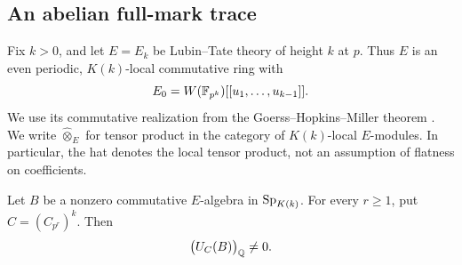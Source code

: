 \subsection{An abelian full-mark trace}

Fix \(k>0\), and let \(E=E_k\) be Lubin--Tate theory of height \(k\)
at \(p\).  Thus \(E\) is an even periodic, \(K(k)\)-local
commutative ring with
\[
 E_0=W(\mathbb F_{p^k})[[u_1,\ldots,u_{k-1}]].
\]
We use its commutative realization from the Goerss--Hopkins--Miller
theorem \cite[Section~7]{GH}.
We write \(\widehat\otimes_E\) for tensor product in the category of
\(K(k)\)-local \(E\)-modules.  In particular, the hat denotes the
local tensor product, not an assumption of flatness on coefficients.

\begin{proposition}
\label{prop:abelian-full-mark}
Let \(B\) be a nonzero commutative \(E\)-algebra in
\(\mathrm{Sp}_{K(k)}\).  For every \(r\ge1\), put \(C=(C_{p^r})^k\).
Then
\[
 \bigl(U_C(B)\bigr)_{\mathbb Q}\ne0.
\]
\end{proposition}
